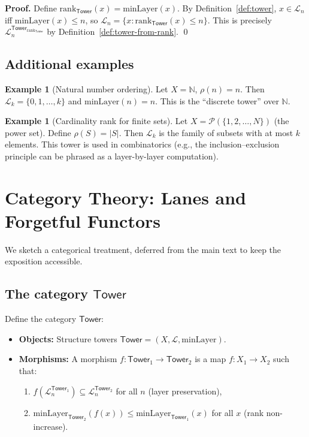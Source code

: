 \documentclass[11pt]{article}
\theoremstyle{definition}
\newtheorem{example}[theorem]{Example}
\theoremstyle{remark}
\newcommand{\layer}{\mathcal{L}}
\newcommand{\minLayer}{\mathrm{minLayer}}
\newcommand{\rank}{\mathrm{rank}}
\newcommand{\Tower}{\mathsf{Tower}}
\newcommand{\NN}{\mathbb{N}}
\begin{document}
\noindent\textbf{Proof.}
Define $\rank_\Tower(x) = \minLayer(x)$.
By Definition~\ref{def:tower}, $x \in \layer_n$ iff $\minLayer(x) \leq n$, so $\layer_n = \{x : \rank_\Tower(x) \leq n\}$.
This is precisely $\layer_n^{\Tower_{\rank_\Tower}}$ by Definition~\ref{def:tower-from-rank}.
\qed

\subsection{Additional examples}

\begin{example}[Natural number ordering]
Let $X = \NN$, $\rho(n) = n$.
Then $\layer_k = \{0,1,\ldots,k\}$ and $\minLayer(n) = n$.
This is the ``discrete tower'' over $\NN$.
\end{example}

\begin{example}[Cardinality rank for finite sets]
Let $X = \mathcal{P}(\{1,2,\ldots,N\})$ (the power set).
Define $\rho(S) = |S|$.
Then $\layer_k$ is the family of subsets with at most $k$ elements.
This tower is used in combinatorics (e.g., the inclusion--exclusion principle can be phrased as a layer-by-layer computation).
\end{example}

\section{Category Theory: Lanes and Forgetful Functors}
\label{app:cat}

We sketch a categorical treatment, deferred from the main text to keep the exposition accessible.

\subsection{The category $\mathsf{Tower}$}

Define the category $\mathsf{Tower}$:
\begin{itemize}
\item \textbf{Objects:} Structure towers $\Tower = (X, \layer, \minLayer)$.
\item \textbf{Morphisms:} A morphism $f: \Tower_1 \to \Tower_2$ is a map $f: X_1 \to X_2$ such that:
  \begin{enumerate}
  \item $f(\layer_n^{\Tower_1}) \subseteq \layer_n^{\Tower_2}$ for all $n$ (layer preservation),
  \item $\minLayer_{\Tower_2}(f(x)) \leq \minLayer_{\Tower_1}(x)$ for all $x$ (rank non-increase).
  \end{enumerate}
\end{itemize}
\end{document}
